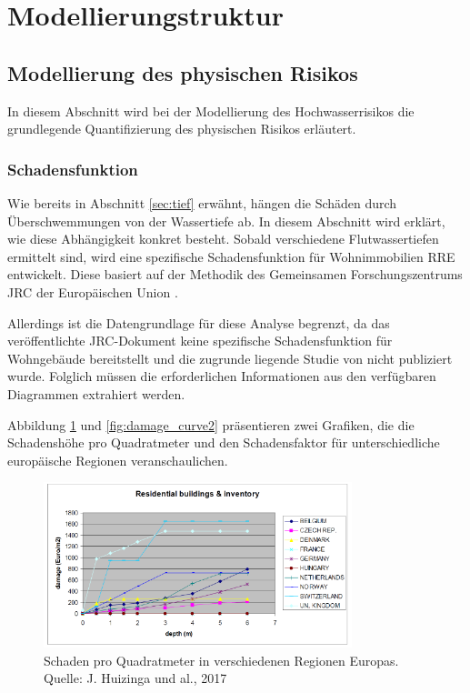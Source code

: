 
\section{Modellierungstruktur}
\subsection{Modellierung des physischen Risikos}
In diesem Abschnitt wird bei der Modellierung des Hochwasserrisikos die grundlegende Quantifizierung des physischen Risikos erläutert.

\subsubsection{Schadensfunktion}\label{sec:schadenfkt}
Wie bereits in Abschnitt \ref{sec:tief} erwähnt, hängen die Schäden durch Überschwemmungen von der Wassertiefe ab. In diesem Abschnitt wird erklärt, wie diese Abhängigkeit konkret besteht.
Sobald verschiedene Flutwassertiefen ermittelt sind, wird eine spezifische Schadensfunktion für Wohnimmobilien \acs{RRE} entwickelt. Diese basiert auf der Methodik des Gemeinsamen Forschungszentrums \acs{JRC} der Europäischen Union \parencite{huizinga2017global}.

Allerdings ist die Datengrundlage für diese Analyse begrenzt, da das veröffentlichte \acs{JRC}-Dokument keine spezifische Schadensfunktion für Wohngebäude bereitstellt und die zugrunde liegende Studie von \textcite{huizinga2007flood} nicht publiziert wurde. Folglich müssen die erforderlichen Informationen aus den verfügbaren Diagrammen extrahiert werden.

Abbildung \ref{fig:damage_curve1} und \ref{fig:damage_curve2} präsentieren zwei Grafiken, die die Schadenshöhe pro Quadratmeter und den Schadensfaktor für unterschiedliche europäische Regionen veranschaulichen.

\begin{figure}[H]
    \centering
    \includegraphics[width=0.8\textwidth]{figures/RREdamagem2.png}
    \caption{Schaden pro Quadratmeter in verschiedenen Regionen Europas. Quelle: J. Huizinga und al., 2017}
    \label{fig:damage_curve1}
\end{figure}

